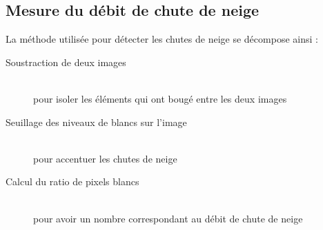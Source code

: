 \subsection{Mesure du débit de chute de neige}
La méthode utilisée pour détecter les chutes de neige se décompose ainsi :
\begin{description}
    \item[Soustraction de deux images] \hfill \\
    pour isoler les éléments qui ont bougé entre les deux images
    \item[Seuillage des niveaux de blancs sur l'image] \hfill \\
    pour accentuer les chutes de neige
    \item[Calcul du ratio de pixels blancs] \hfill \\
    pour avoir un nombre correspondant au débit de chute de neige    
\end{description}

